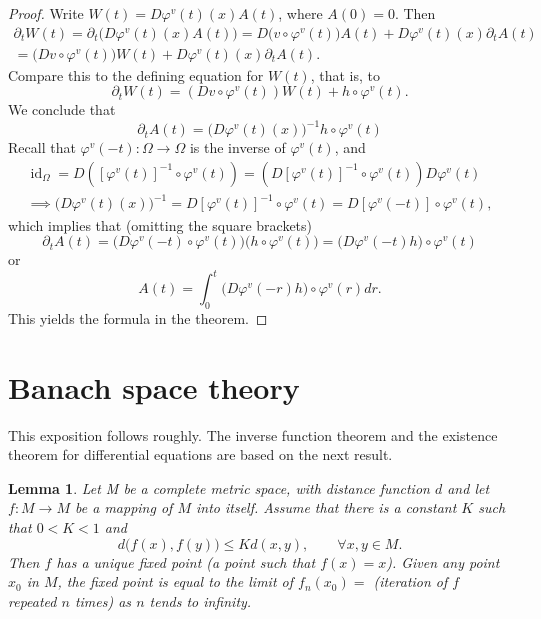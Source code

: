 \documentclass[a5paper,10pt,twoside]{article}
\DeclareMathOperator*{\id}{id}
\theoremstyle{plain}
\newtheorem{lem}[teo]{Lemma}
\theoremstyle{definition}
\theoremstyle{remark}
\begin{document}
\begin{proof}
	Write $W(t)=D\varphi^v(t)(x)A(t)$, where $A(0)=0$. Then
	\begin{multline*}
	\partial_tW(t)=\partial_t\big(D\varphi^v(t)(x)A(t)\big)=D\big(v\circ \varphi^v(t)\big)A(t)+D\varphi^v(t)(x)\partial_tA(t)\\
	=\big(Dv\circ \varphi^v(t)\big)W(t)+D\varphi^v(t)(x)\partial_tA(t).
	\end{multline*}
	Compare this to the defining equation for $W(t)$, that is, to
	\[
	\partial_t W(t)=\left(Dv\circ \varphi^v(t)\right)W(t)+h\circ \varphi^v(t).
	\]
	We conclude that
	\[
	\partial_tA(t)=\big(D\varphi^v(t)(x)\big)^{-1}h\circ \varphi^v(t)
	\]
	Recall that $\varphi^v(-t):\Omega\to\Omega$ is the inverse of $\varphi^v(t)$, and
	\begin{multline*}
	\id_\Omega=D\left([\varphi^v(t)]^{-1}\circ\varphi^v(t)\right)=\left(D[\varphi^v(t)]^{-1}\circ \varphi^v(t)\right)D\varphi^v(t) \\
	\implies \big(D\varphi^v(t)(x)\big)^{-1}=D[\varphi^v(t)]^{-1}\circ \varphi^v(t)=D[\varphi^v(-t)]\circ \varphi^v(t),
	\end{multline*}
	which implies that (omitting the square brackets)
	\[
	\partial_tA(t)=\big(D\varphi^v(-t)\circ \varphi^v(t)\big)\big(h\circ  \varphi^v(t)\big)=\big(D\varphi^v(-t)h\big)\circ \varphi^v(t)
	\]
	or
	\[
	A(t)=\int_0^t\big(D\varphi^v(-r)h\big)\circ \varphi^v(r) dr.
	\]
	This yields the formula in the theorem.
\end{proof}




\section{Banach space theory \label{app:Banach}}
This exposition follows \cite{lang1999} roughly. The inverse function theorem and the existence theorem for differential equations are based on the next result.

\begin{lem}
	Let M be a complete metric space, with distance function $d$ and let $f:M\to M$ be a mapping of $M$ into itself. Assume that there is a constant $K$ such that $0<K<1$ and
	\[
	d\big(f(x),f(y)\big)\leq K d(x,y),\qquad\forall x,y\in M.
	\]
	Then $f$ has a unique fixed point (a point such that $f(x) = x$). Given any
	point $x_0$ in $M$, the fixed point is equal to the limit of $f_n(x_0)=$ (iteration of $f$ repeated $n$ times) as $n$ tends to infinity.
\end{lem}
\end{document}
